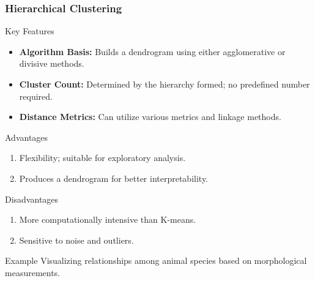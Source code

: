 \documentclass[aspectratio=169]{beamer}
\begin{document}
\begin{frame}[fragile]
    \frametitle{Hierarchical Clustering}

    \begin{block}{Key Features}
        \begin{itemize}
            \item \textbf{Algorithm Basis:} Builds a dendrogram using either agglomerative or divisive methods.
            \item \textbf{Cluster Count:} Determined by the hierarchy formed; no predefined number required.
            \item \textbf{Distance Metrics:} Can utilize various metrics and linkage methods.
        \end{itemize}
    \end{block}
    
    \begin{block}{Advantages}
        \begin{enumerate}
            \item Flexibility; suitable for exploratory analysis.
            \item Produces a dendrogram for better interpretability.
        \end{enumerate}
    \end{block}
    
    \begin{block}{Disadvantages}
        \begin{enumerate}
            \item More computationally intensive than K-means.
            \item Sensitive to noise and outliers.
        \end{enumerate}
    \end{block}

    \begin{exampleblock}{Example}
        Visualizing relationships among animal species based on morphological measurements.
    \end{exampleblock}
\end{frame}
\end{document}
